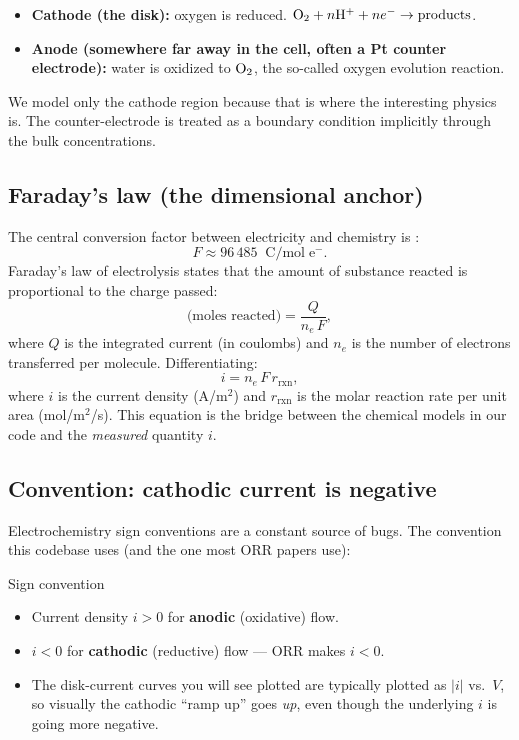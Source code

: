 \documentclass[11pt]{article}
\begin{document}
\begin{itemize}[leftmargin=*]
\item \textbf{Cathode (the disk):} oxygen is reduced.
  $\mathrm{O_2} + n\mathrm{H^+} + n e^- \rightarrow \text{products}$.
\item \textbf{Anode (somewhere far away in the cell, often a Pt
  counter electrode):} water is oxidized to $\mathrm{O_2}$, the so-called
  oxygen evolution reaction.
\end{itemize}

We model only the cathode region because that is where the
interesting physics is. The counter-electrode is treated as a
boundary condition implicitly through the bulk concentrations.

\subsection{Faraday's law (the dimensional anchor)}

The central conversion factor between electricity and chemistry is
:
\[
  F \approx 96\,485 \;\; \mathrm{C/mol\;e^-}.
\]
Faraday's law of electrolysis states that the amount of substance
reacted is proportional to the charge passed:
\[
  \text{(moles reacted)} = \frac{Q}{n_e\,F},
\]
where $Q$ is the integrated current (in coulombs) and $n_e$ is the
number of electrons transferred per molecule. Differentiating:
\begin{equation}
  i = n_e\,F\,r_{\text{rxn}},
  \label{eq:faraday}
\end{equation}
where $i$ is the current density (A/m$^2$) and $r_{\text{rxn}}$ is
the molar reaction rate per unit area (mol/m$^2$/s). This equation
is the bridge between the chemical models in our code and the
\textit{measured} quantity $i$.

\subsection{Convention: cathodic current is negative}

Electrochemistry sign conventions are a constant source of bugs.
The convention this codebase uses (and the one most ORR papers use):

\begin{callout}{Sign convention}
\begin{itemize}[leftmargin=*]
\item Current density $i > 0$ for \textbf{anodic} (oxidative) flow.
\item $i < 0$ for \textbf{cathodic} (reductive) flow --- ORR makes
      $i < 0$.
\item The disk-current curves you will see plotted are typically
      plotted as $|i|$ vs.\ $V$, so visually the cathodic ``ramp up''
      goes \textit{up}, even though the underlying $i$ is going more
      negative.
\end{itemize}
\end{callout}
\end{document}
